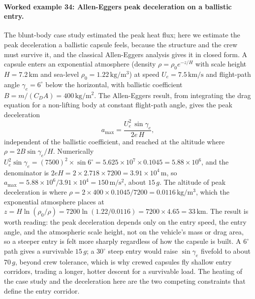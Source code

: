\paragraph{Worked example 34: Allen-Eggers peak deceleration on a
ballistic entry.} The blunt-body case study estimated the peak heat
flux; here we estimate the peak deceleration a ballistic capsule feels,
because the structure and the crew must survive it, and the classical
Allen-Eggers analysis gives it in closed form. A capsule enters an
exponential atmosphere (density $\rho = \rho_0 e^{-z/H}$ with scale
height $H = 7.2\,\si{\kilo\meter}$ and sea-level
$\rho_0 = 1.22\,\si{\kilogram\per\meter\cubed}$) at speed
$U_e = 7.5\,\si{\kilo\meter\per\second}$ and flight-path angle
$\gamma_e = 6^{\circ}$ below the horizontal, with ballistic coefficient
$B = m/(C_D A) = 400\,\si{\kilogram\per\meter\squared}$. The
Allen-Eggers result, from integrating the drag equation for a
non-lifting body at constant flight-path angle, gives the peak
deceleration
\[
a_{\max} = \frac{U_e^2\,\sin\gamma_e}{2 e\,H},
\]
independent of the ballistic coefficient, and reached at the altitude
where $\rho = 2 B\sin\gamma_e/H$. Numerically
$U_e^2\sin\gamma_e = (7500)^2\times\sin 6^{\circ} =
5.625\times 10^{7}\times 0.1045 = 5.88\times 10^{6}$, and the
denominator is $2 e H = 2\times 2.718\times 7200 =
3.91\times 10^{4}\,\si{\meter}$, so
$a_{\max} = 5.88\times 10^{6}/3.91\times 10^{4} =
150\,\si{\meter\per\second\squared}$, about $15\,g$. The altitude of
peak deceleration is where
$\rho = 2\times 400\times 0.1045/7200 = 0.0116\,\si{\kilogram\per
\meter\cubed}$, which the exponential atmosphere places at
$z = H\ln(\rho_0/\rho) = 7200\ln(1.22/0.0116) = 7200\times 4.65 =
33\,\si{\kilo\meter}$. The result is worth reading: the peak
deceleration depends only on the entry speed, the entry angle, and the
atmospheric scale height, not on the vehicle's mass or drag area, so a
steeper entry is felt more sharply regardless of how the capsule is
built. A $6^{\circ}$ path gives a survivable $15\,g$; a $30^{\circ}$
steep entry would raise $\sin\gamma_e$ fivefold to about $70\,g$, beyond
crew tolerance, which is why crewed capsules fly shallow entry
corridors, trading a longer, hotter descent for a survivable load. The
heating of the case study and the deceleration here are the two
competing constraints that define the entry corridor.

